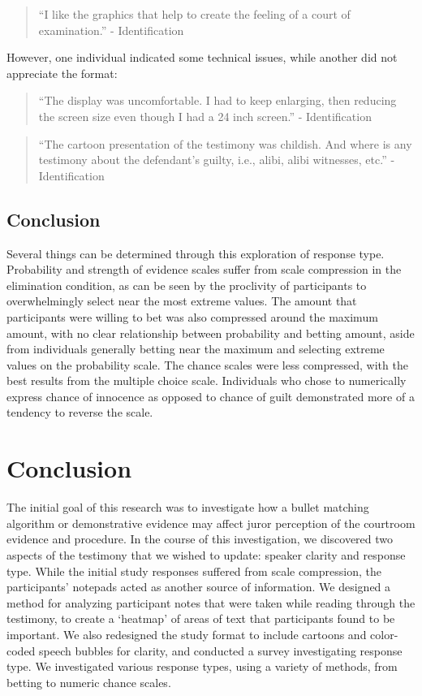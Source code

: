 \documentclass[print]{nuthesis}
\begin{document}
\begin{quote}
``I like the graphics that help to create the feeling of a court of examination.'' - Identification
\end{quote}

However, one individual indicated some technical issues, while another did not appreciate the format:

\begin{quote}
``The display was uncomfortable. I had to keep enlarging, then reducing the screen size even though I had a 24 inch screen.'' - Identification
\end{quote}

\begin{quote}
``The cartoon presentation of the testimony was childish. And where is any testimony about the defendant's guilty, i.e., alibi, alibi witnesses, etc.'' - Identification
\end{quote}

\hypertarget{conclusion-2}{%
\section{Conclusion}\label{conclusion-2}}

Several things can be determined through this exploration of response type.
Probability and strength of evidence scales suffer from scale compression in the elimination condition, as can be seen by the proclivity of participants to overwhelmingly select near the most extreme values.
The amount that participants were willing to bet was also compressed around the maximum amount, with no clear relationship between probability and betting amount, aside from individuals generally betting near the maximum and selecting extreme values on the probability scale.
The chance scales were less compressed, with the best results from the multiple choice scale.
Individuals who chose to numerically express chance of innocence as opposed to chance of guilt demonstrated more of a tendency to reverse the scale.

\hypertarget{finalstudy}{%
\chapter{Conclusion}\label{finalstudy}}

The initial goal of this research was to investigate how a bullet matching algorithm or demonstrative evidence may affect juror perception of the courtroom evidence and procedure.
In the course of this investigation, we discovered two aspects of the testimony that we wished to update: speaker clarity and response type.
While the initial study responses suffered from scale compression, the participants' notepads acted as another source of information.
We designed a method for analyzing participant notes that were taken while reading through the testimony, to create a `heatmap' of areas of text that participants found to be important.
We also redesigned the study format to include cartoons and color-coded speech bubbles for clarity, and conducted a survey investigating response type.
We investigated various response types, using a variety of methods, from betting to numeric chance scales.
\end{document}
